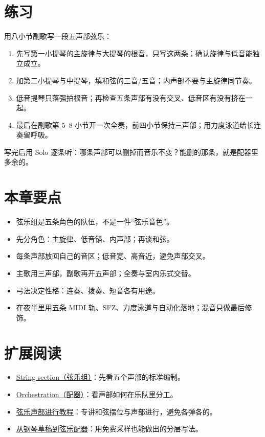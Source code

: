 \section{练习}
\label{sec:string-exercise}

\begin{exercise}
用八小节副歌写一段五声部弦乐：
\begin{enumerate}
\item 先写第一小提琴的主旋律与大提琴的根音，只写这两条；确认旋律与低音能独立成立。
\item 加第二小提琴与中提琴，填和弦的三音/五音；内声部不要与主旋律同节奏。
\item 低音提琴只落强拍根音；再检查五条声部有没有交叉、低音区有没有挤在一起。
\item 最后在副歌第 5--8 小节开一次全奏，前四小节保持三声部；用力度泳道给长连奏留呼吸。
\end{enumerate}
写完后用 Solo 逐条听：哪条声部可以删掉而音乐不变？能删的那条，就是配器里多余的。
\end{exercise}

\section{本章要点}
\label{sec:string-takeaways}

\begin{itemize}
\item 弦乐组是五条角色的队伍，不是一件“弦乐音色”。
\item 先分角色：主旋律、低音锚、内声部；再谈和弦。
\item 每条声部放回自己的音区；低音宽、高音近，避免声部交叉。
\item 主歌用三声部，副歌再开五声部；全奏与室内乐式交替。
\item 弓法决定性格：连奏、拨奏、短音各有用途。
\item 在夜半里用五条 MIDI 轨、SFZ、力度泳道与自动化落地；混音只做最后修饰。
\end{itemize}

\section{扩展阅读}
\label{sec:06-strings-further-reading}
\begin{itemize}
  \item \href{https://en.wikipedia.org/wiki/String_section}{String section（弦乐组）}：先看五个声部的标准编制。
  \item \href{https://en.wikipedia.org/wiki/Orchestration}{Orchestration（配器）}：看声部如何在乐队里分工。
  \item \href{https://www.youtube.com/watch?v=UlJ3a7xvCYI}{弦乐声部进行教程}：专讲和弦摆位与声部进行，避免各弹各的。
  \item \href{https://www.youtube.com/watch?v=CSq3tsfYcUU}{从钢琴草稿到弦乐配器}：用免费采样也能做出的分层写法。
\end{itemize}

